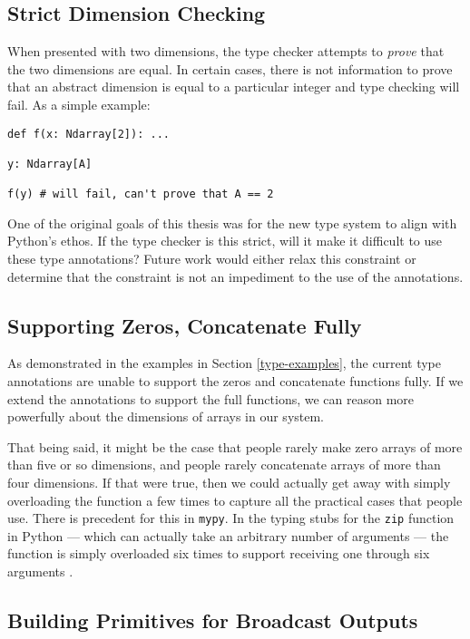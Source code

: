 \documentclass[12pt]{report}
\begin{document}
\subsection{Strict Dimension Checking}

When presented with two dimensions, the type checker attempts to \textit{prove} that the two dimensions are equal. In certain cases, there is not information to prove that an abstract dimension is equal to a particular integer and type checking will fail. As a simple example:

\begin{singlespace*}
    \begin{verbatim}
def f(x: Ndarray[2]): ...

y: Ndarray[A]

f(y) # will fail, can't prove that A == 2\end{verbatim}
\end{singlespace*}

One of the original goals of this thesis was for the new type system to align with Python's ethos. If the type checker is this strict, will it make it difficult to use these type annotations? Future work would either relax this constraint or determine that the constraint is not an impediment to the use of the annotations.

\subsection{Supporting Zeros, Concatenate Fully}

As demonstrated in the examples in Section \ref{type-examples}, the current type annotations are unable to support the zeros and concatenate functions fully. If we extend the annotations to support the full functions, we can reason more powerfully about the dimensions of arrays in our system.

That being said, it might be the case that people rarely make zero arrays of more than five or so dimensions, and people rarely concatenate arrays of more than four dimensions. If that were true, then we could actually get away with simply overloading the function a few times to capture all the practical cases that people use. There is precedent for this in \texttt{mypy}. In the typing stubs for the \texttt{zip} function in Python --- which can actually take an arbitrary number of arguments --- the function is simply overloaded six times to support receiving one through six arguments \cite{typeshed}.

\subsection{Building Primitives for Broadcast Outputs}
\end{document}

